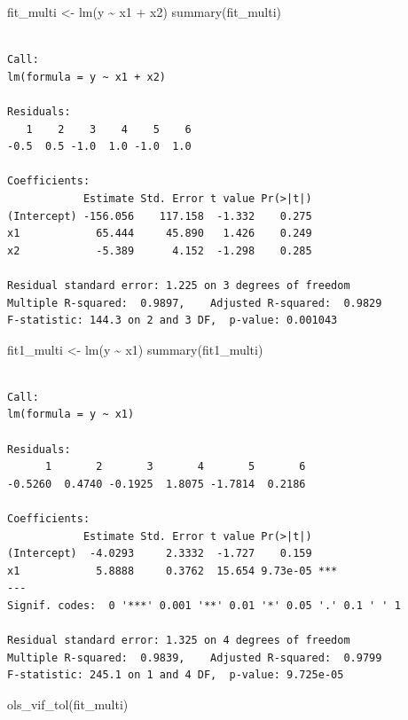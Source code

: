 \documentclass[
  letterpaper,
]{scrbook}
\newenvironment{Shaded}{\begin{snugshade}}{\end{snugshade}}
\newcommand{\FunctionTok}[1]{\textcolor[rgb]{0.28,0.35,0.67}{#1}}
\newcommand{\NormalTok}[1]{\textcolor[rgb]{0.00,0.23,0.31}{#1}}
\newcommand{\OtherTok}[1]{\textcolor[rgb]{0.00,0.23,0.31}{#1}}
\newcommand{\SpecialCharTok}[1]{\textcolor[rgb]{0.37,0.37,0.37}{#1}}
\begin{document}
\begin{Shaded}
\begin{Highlighting}[]
\NormalTok{fit\_multi }\OtherTok{\textless{}{-}} \FunctionTok{lm}\NormalTok{(y }\SpecialCharTok{\textasciitilde{}}\NormalTok{ x1 }\SpecialCharTok{+}\NormalTok{ x2)}
\FunctionTok{summary}\NormalTok{(fit\_multi)}
\end{Highlighting}
\end{Shaded}

\begin{verbatim}

Call:
lm(formula = y ~ x1 + x2)

Residuals:
   1    2    3    4    5    6 
-0.5  0.5 -1.0  1.0 -1.0  1.0 

Coefficients:
            Estimate Std. Error t value Pr(>|t|)
(Intercept) -156.056    117.158  -1.332    0.275
x1            65.444     45.890   1.426    0.249
x2            -5.389      4.152  -1.298    0.285

Residual standard error: 1.225 on 3 degrees of freedom
Multiple R-squared:  0.9897,    Adjusted R-squared:  0.9829 
F-statistic: 144.3 on 2 and 3 DF,  p-value: 0.001043
\end{verbatim}

\begin{Shaded}
\begin{Highlighting}[]
\NormalTok{fit1\_multi }\OtherTok{\textless{}{-}} \FunctionTok{lm}\NormalTok{(y }\SpecialCharTok{\textasciitilde{}}\NormalTok{ x1)}
\FunctionTok{summary}\NormalTok{(fit1\_multi)}
\end{Highlighting}
\end{Shaded}

\begin{verbatim}

Call:
lm(formula = y ~ x1)

Residuals:
      1       2       3       4       5       6 
-0.5260  0.4740 -0.1925  1.8075 -1.7814  0.2186 

Coefficients:
            Estimate Std. Error t value Pr(>|t|)    
(Intercept)  -4.0293     2.3332  -1.727    0.159    
x1            5.8888     0.3762  15.654 9.73e-05 ***
---
Signif. codes:  0 '***' 0.001 '**' 0.01 '*' 0.05 '.' 0.1 ' ' 1

Residual standard error: 1.325 on 4 degrees of freedom
Multiple R-squared:  0.9839,    Adjusted R-squared:  0.9799 
F-statistic: 245.1 on 1 and 4 DF,  p-value: 9.725e-05
\end{verbatim}

\begin{Shaded}
\begin{Highlighting}[]
\FunctionTok{ols\_vif\_tol}\NormalTok{(fit\_multi)}
\end{Highlighting}
\end{Shaded}
\end{document}
